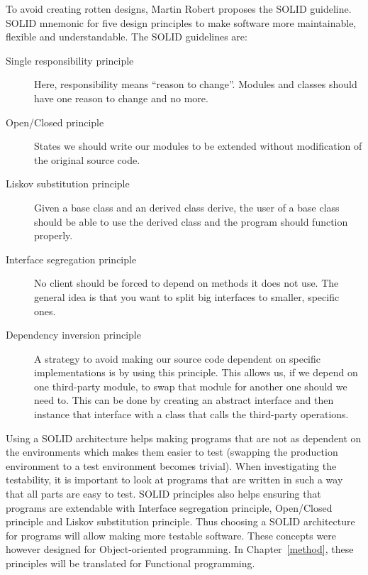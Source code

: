 To avoid creating rotten designs, Martin Robert proposes the SOLID guideline.
SOLID mnemonic for five design principles to make software more maintainable,
flexible and understandable. The SOLID guidelines are:

\begin{description}
    \item [Single responsibility principle] Here, responsibility means ``reason
        to change''. Modules and classes should have one reason to change and no
        more.
    \item [Open/Closed principle] States we should write our modules to be
        extended without modification of the original source code.
    \item [Liskov substitution principle] Given a base class and an derived
        class derive, the user of a base class should be able to use the derived
        class and the program should function properly.
    \item [Interface segregation principle] No client should be forced to depend
        on methods it does not use. The general idea is that you want to split
        big interfaces to smaller, specific ones.
    \item [Dependency inversion principle] A strategy to avoid making our source
        code dependent on specific implementations is by using this principle.
        This allows us, if we depend on one third-party module, to swap that
        module for another one should we need to. This can be done by creating
        an abstract interface and then instance that interface with a class that
        calls the third-party operations.~\cite{martinrobert}
\end{description}

Using a SOLID architecture helps making programs that are not as dependent on
the environments which makes them easier to test (swapping the production
environment to a test environment becomes trivial). When investigating the
testability, it is important to look at programs that are written in such a way
that all parts are easy to test. SOLID principles also helps ensuring that
programs are extendable with Interface segregation principle, Open/Closed
principle and Liskov substitution principle. Thus choosing a SOLID architecture
for programs will allow making more testable software. These concepts were
however designed for Object-oriented programming. In Chapter~\ref{method},
these principles will be translated for Functional programming. 

